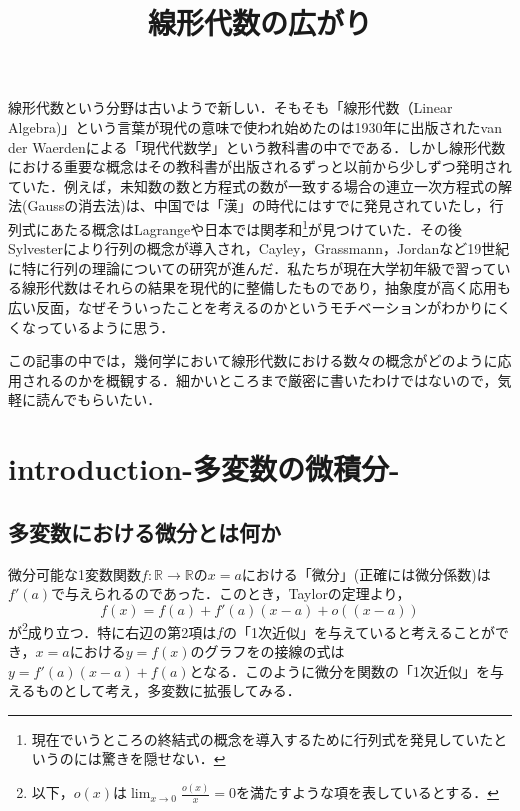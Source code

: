 \documentclass{jsarticle}
\title{線形代数の広がり}
\def\realnum{{\mathbb R}}
\begin{document}
\maketitle
線形代数という分野は古いようで新しい．そもそも「線形代数（Linear Algebra)」という言葉が現代の意味で使われ始めたのは1930年に出版されたvan der Waerdenによる「現代代数学」という教科書の中でである．しかし線形代数における重要な概念はその教科書が出版されるずっと以前から少しずつ発明されていた．例えば，未知数の数と方程式の数が一致する場合の連立一次方程式の解法(Gaussの消去法)は、中国では「漢」の時代にはすでに発見されていたし，行列式にあたる概念はLagrangeや日本では関孝和\footnote{現在でいうところの終結式の概念を導入するために行列式を発見していたというのには驚きを隠せない．}が見つけていた．その後Sylvesterにより行列の概念が導入され，Cayley，Grassmann，Jordanなど19世紀に特に行列の理論についての研究が進んだ．私たちが現在大学初年級で習っている線形代数はそれらの結果を現代的に整備したものであり，抽象度が高く応用も広い反面，なぜそういったことを考えるのかというモチベーションがわかりにくくなっているように思う．


この記事の中では，幾何学において線形代数における数々の概念がどのように応用されるのかを概観する．細かいところまで厳密に書いたわけではないので，気軽に読んでもらいたい．
\tableofcontents

\section{introduction-多変数の微積分-}
\subsection{多変数における微分とは何か}
微分可能な1変数関数$f:\realnum\rightarrow\realnum$の$x=a$における「微分」(正確には微分係数)は$f'(a)$で与えられるのであった．このとき，Taylorの定理より，
$$
f(x)=f(a)+f'(a)(x-a)+o((x-a))
$$
が\footnote{以下，$o(x)$は$\lim_{x\rightarrow 0}\frac{o(x)}{x}=0$を満たすような項を表しているとする．}成り立つ．特に右辺の第2項は$f$の「1次近似」を与えていると考えることができ，$x=a$における$y=f(x)$のグラフをの接線の式は$y=f'(a)(x-a)+f(a)$となる．このように微分を関数の「1次近似」を与えるものとして考え，多変数に拡張してみる．
\end{document}
